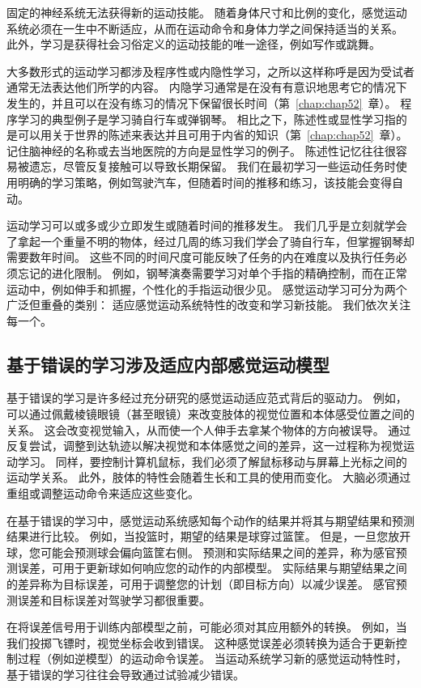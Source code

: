固定的神经系统无法获得新的运动技能。
随着身体尺寸和比例的变化，感觉运动系统必须在一生中不断适应，从而在运动命令和身体力学之间保持适当的关系。
此外，学习是获得社会习俗定义的运动技能的唯一途径，例如写作或跳舞。


大多数形式的运动学习都涉及程序性或内隐性学习，之所以这样称呼是因为受试者通常无法表达他们所学的内容。
内隐学习通常是在没有有意识地思考它的情况下发生的，并且可以在没有练习的情况下保留很长时间（第~\ref{chap:chap52}~章）。
程序学习的典型例子是学习骑自行车或弹钢琴。 相比之下，陈述性或显性学习指的是可以用关于世界的陈述来表达并且可用于内省的知识（第~\ref{chap:chap52}~章）。
记住脑神经的名称或去当地医院的方向是显性学习的例子。
陈述性记忆往往很容易被遗忘，尽管反复接触可以导致长期保留。
我们在最初学习一些运动任务时使用明确的学习策略，例如驾驶汽车，但随着时间的推移和练习，该技能会变得自动。


运动学习可以或多或少立即发生或随着时间的推移发生。
我们几乎是立刻就学会了拿起一个重量不明的物体，经过几周的练习我们学会了骑自行车，但掌握钢琴却需要数年时间。
这些不同的时间尺度可能反映了任务的内在难度以及执行任务必须忘记的进化限制。
例如，钢琴演奏需要学习对单个手指的精确控制，而在正常运动中，例如伸手和抓握，个性化的手指运动很少见。
感觉运动学习可分为两个广泛但重叠的类别：
适应感觉运动系统特性的改变和学习新技能。
我们依次关注每一个。



\subsection{基于错误的学习涉及适应内部感觉运动模型}

基于错误的学习是许多经过充分研究的感觉运动适应范式背后的驱动力。
例如，可以通过佩戴棱镜眼镜（甚至眼镜）来改变肢体的视觉位置和本体感受位置之间的关系。
这会改变视觉输入，从而使一个人伸手去拿某个物体的方向被误导。
通过反复尝试，调整到达轨迹以解决视觉和本体感觉之间的差异，这一过程称为视觉运动学习。
同样，要控制计算机鼠标，我们必须了解鼠标移动与屏幕上光标之间的运动学关系。
此外，肢体的特性会随着生长和工具的使用而变化。
大脑必须通过重组或调整运动命令来适应这些变化。


在基于错误的学习中，感觉运动系统感知每个动作的结果并将其与期望结果和预测结果进行比较。
例如，当投篮时，期望的结果是球穿过篮筐。
但是，一旦您放开球，您可能会预测球会偏向篮筐右侧。
预测和实际结果之间的差异，称为感官预测误差，可用于更新球如何响应您的动作的内部模型。
实际结果与期望结果之间的差异称为目标误差，可用于调整您的计划（即目标方向）以减少误差。
感官预测误差和目标误差对驾驶学习都很重要。


在将误差信号用于训练内部模型之前，可能必须对其应用额外的转换。
例如，当我们投掷飞镖时，视觉坐标会收到错误。
这种感觉误差必须转换为适合于更新控制过程（例如逆模型）的运动命令误差。
当运动系统学习新的感觉运动特性时，基于错误的学习往往会导致通过试验减少错误。


